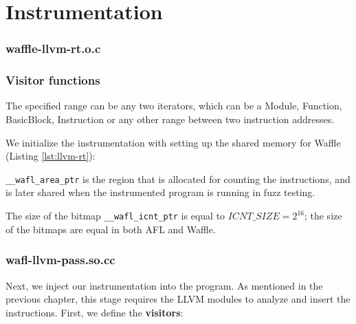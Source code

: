 \section{Instrumentation}
\label{sec:3-instr}

\subsubsection*{waffle-llvm-rt.o.c}


\subsubsection{Visitor functions}




The specified range can be any two iterators, which can be a Module, Function, BasicBlock, Instruction or any other range between two instruction addresses.


We initialize the instrumentation with setting up the shared memory for Waffle (Listing \ref{lst:llvm-rt}):



\texttt{\_\_wafl\_area\_ptr} is the region that is allocated for counting the instructions, and is later shared when the instrumented program is running in fuzz testing.

The size of the bitmap \texttt{\_\_wafl\_icnt\_ptr} is equal to $ICNT\_SIZE=2^{16}$; the size of the bitmaps are equal in both AFL and Waffle.

\subsubsection*{wafl-llvm-pass.so.cc}

Next, we inject our instrumentation into the program. As mentioned in the previous chapter, this stage requires the LLVM modules to analyze and insert the instructions. First, we define the \textbf{visitors}:

